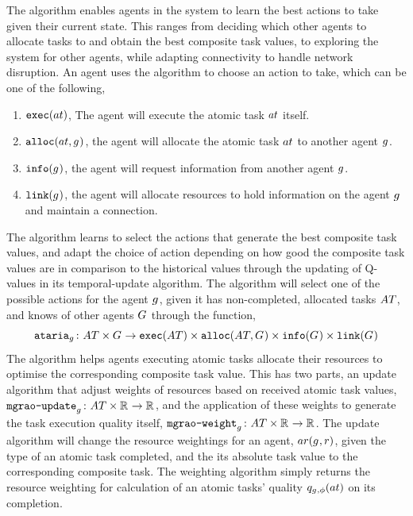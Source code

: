 The \acronymATARIA{}{} algorithm enables agents in the system to learn the best actions to take given their current state. This ranges from deciding which other agents to allocate tasks to and obtain the best composite task values, to exploring the system for other agents, while adapting connectivity to handle network disruption. An agent uses the \acronymATARIA{}{} algorithm to choose an action to take, which can be one of the following,
\begin{enumerate}
	\item $\functionExec{}{}$, The agent will execute the atomic task $\varAtomicTask{}{}$ itself.
	\item $\functionAlloc{}{}$, the agent will allocate the atomic task $\varAtomicTask{}{}$ to another agent $g_{}^{}$.
	\item $\texttt{info}(g_{}^{})$, the agent will request information from another agent $g_{}^{}$.
	\item $\texttt{link}(g_{}^{})$, the agent will allocate resources to hold information on the agent $g_{}^{}$ and maintain a connection.
\end{enumerate}
The \acronymATARIA{}{} algorithm learns to select the actions that generate the best composite task values, and adapt the choice of action depending on how good the composite task values are in comparison to the historical values through the updating of Q-values in its temporal-update algorithm. The algorithm will select one of the possible actions for the agent $g_{}^{}$, given it has non-completed, allocated tasks $\setAtomicTask{}{}$, and knows of other agents $G_{}^{}$ through the function,
\begin{equation}
\label{eq:ataria}\formalATARIA{}{}
\end{equation}
The \acronymMGRAO{}{} algorithm helps agents executing atomic tasks allocate their resources to optimise the corresponding composite task value. This has two parts, an update algorithm that adjust weights of resources based on received atomic task values, $\label{eq:mgrao_update}\formalMGRAOUpdate{}{}$,  and the application of these weights to generate the task execution quality itself, $\label{eq:mgrao_weighting}\formalMGRAOWeighting{}{}$. The update algorithm will change the resource weightings for an agent, $\functionAgentResources{}{}$, given the type of an atomic task completed, and the its absolute task value to the corresponding composite task. The weighting algorithm simply returns the resource weighting for calculation of an atomic tasks' quality $\functionAtomicTaskQualitySignature{}{}$ on its completion.

